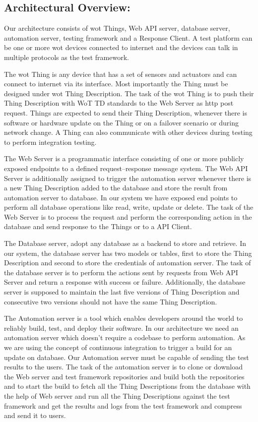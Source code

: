 \documentclass[conference]{IEEEtran}
\theoremstyle{definition}
\begin{document}
\subsection{Architectural Overview: }
Our architecture consists of \ac{wot} Things, Web API server, database server, automation server, testing framework and a Response Client. 
A test platform can be one or more \ac{wot} devices connected to internet and the devices can talk in multiple protocols as the test framework. 

The \ac{wot} Thing is any device that has a set of sensors and actuators and can connect to internet via its interface. 
Most importantly the Thing must be designed under \ac{wot} Thing Description. 
The task of the \ac{wot} Thing is to push their Thing Description with WoT TD standards to the Web  Server as http post request. 
Things are expected to send their Thing Description, whenever there is software or hardware update on the Thing or on a failover scenario or during network change. 
A Thing can also communicate with other devices during testing to perform integration testing.

The Web Server is a programmatic interface consisting of one or more publicly exposed endpoints to a defined request–response message system. 
The Web API Server is additionally assigned to trigger the automation server whenever there is a new Thing Description added to the database and store the result from automation server to database.
In our system we have exposed end points to perform all database operations like read, write, update or delete. 
The task of the Web Server is to process the request and perform the corresponding action in the database and send response to the Things or to a API Client.

The Database server, adopt any database as a backend to store and retrieve.  
In our system, the database server has two models or tables, first to store the Thing Description and second to store the credentials of automation server. 
The task of the database server is to perform the actions sent by requests from Web API Server and return a response with success or failure. 
Additionally, the database server is supposed to maintain the last five versions of Thing Description and consecutive two versions should not have the same Thing Description. 

The Automation server is a tool which enables developers around the world to reliably build, test, and deploy their software. 
In our architecture we need an automation server which doesn’t require a codebase to perform automation. 
As we are using the concept of continuous integration to trigger a build for an update on database. 
Our Automation server must be capable of sending the test results to the users. 
The task of the automation server is 
to clone or download the Web server and test framework repositories and build both the repositories and 
to start the build to fetch all the Thing Descriptions from the database with the help of Web server and 
run all the Thing Descriptions against the test framework and 
get the results and logs from the test framework and compress and send it to users.
\end{document}
